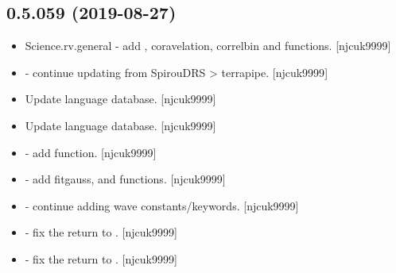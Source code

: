\documentclass[a4paper,10pt,english]{report}
\begin{document}
\subsection{0.5.059 (2019-08-27)}
\label{\detokenize{misc/changelog:id84}}\begin{itemize}
\item {} 
Science.rv.general - add , coravelation, 
 correlbin and  functions. {[}njcuk9999{]}

\item {} 
 - continue updating from SpirouDRS \textendash{}\textgreater{} terrapipe.
{[}njcuk9999{]}

\item {} 
Update language database. {[}njcuk9999{]}

\item {} 
Update language database. {[}njcuk9999{]}

\item {} 
 - add  function. {[}njcuk9999{]}

\item {} 
 - add fitgauss,  and  functions. {[}njcuk9999{]}

\item {} 
 - continue adding wave constants/keywords.
{[}njcuk9999{]}

\item {} 
 - fix the return to . {[}njcuk9999{]}

\item {} 
 - fix the return to . {[}njcuk9999{]}

\end{itemize}
\end{document}
